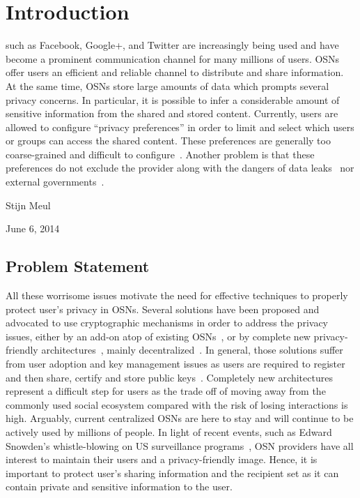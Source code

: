 \documentclass[journal]{IEEEtran}
\begin{document}
\section{Introduction}
% 
% 
% 
% 
 such as Facebook, Google+, and Twitter are increasingly being used and have become a prominent communication channel for many millions of users. OSNs offer users an efficient and reliable channel to distribute and share information. At the same time, OSNs store large amounts of data which prompts several privacy concerns. In particular, it is possible to infer a considerable amount of sensitive information from the shared and stored content. Currently, users are allowed to configure ``privacy preferences'' in order to limit and select which users or groups can access the shared content. These preferences are generally too coarse-grained and difficult to configure~\cite{bonneau2010privacy}. Another problem is that these preferences do not exclude the provider along with the dangers of data leaks~\cite{fischetti11hacker} nor external governments~\cite{prism}. 

\hfill Stijn Meul
 
\hfill June 6, 2014

\subsection{Problem Statement}
All these worrisome issues motivate the need for effective techniques to properly protect user's privacy in OSNs. Several solutions have been proposed and advocated to use cryptographic mechanisms in order to address the privacy issues, either by an add-on atop of existing OSNs~\cite{BadenPersona,BeatoScramble,Guha:2008,Luo:2009}, or by complete new privacy-friendly architectures~\cite{DBLP:conf/sp/CristofaroSTW12}, mainly decentralized~\cite{DBLP:conf/wowmom/CutilloMO11,NYT2010.Diaspora}. In general, those solutions suffer from user adoption and key management issues as users are required to register and then share, certify and store public keys~\cite{article2400}. Completely new architectures represent a difficult step for users as the trade off of moving away from the commonly used social ecosystem compared with the risk of losing interactions is high. Arguably, current centralized OSNs are here to stay and will continue to be actively used by millions of people. In light of recent events, such as Edward Snowden's whistle-blowing on US surveillance programs~\cite{prism}, OSN providers have all interest to maintain their users and a privacy-friendly image. Hence, it is important to protect user's sharing information and the recipient set as it can contain private and sensitive information to the user. 
\end{document}
